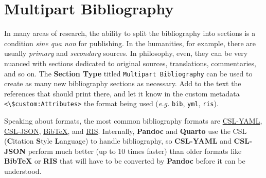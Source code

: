 \documentclass[
  12pt,
  a4paper,
  oneside,
  titlepage,
  toclink=all,
  toc=bibliography]{scrbook}
\theoremstyle{definition}
\theoremstyle{plain}
\theoremstyle{plain}
\theoremstyle{plain}
\theoremstyle{plain}
\theoremstyle{definition}
\theoremstyle{definition}
\theoremstyle{plain}
\theoremstyle{remark}
\begin{document}
\hypertarget{sec-scriv49}{%
\section{Multipart Bibliography}\label{sec-scriv49}}

\protect\hypertarget{scriv49}{}{}

In many areas of research, the ability to split the bibliography into
sections is a condition \emph{sine qua non} for publishing. In the
humanities, for example, there are usually \emph{primary} and
\emph{secondary} sources. In philosophy, even, they can be very nuanced
with sections dedicated to original sources, translations, commentaries,
and so on. The \textbf{Section Type} titled
\texttt{Multipart\ Bibliography} can be used to create as many new
bibliography sections as necessary. Add to the text the references that
should print there, and let it know in the custom metadata
\texttt{\textless{}\textbackslash{}\$custom:Attributes\textgreater{}}
the format being used (\emph{e.g.} \texttt{bib}, \texttt{yml},
\texttt{ris}).

\begin{tcolorbox}[enhanced jigsaw, left=2mm, colframe=quarto-callout-tip-color-frame, bottomtitle=1mm, colback=white, coltitle=black, title=\textcolor{quarto-callout-tip-color}{\faLightbulb}\hspace{0.5em}{Bibliography formats}, toprule=.15mm, rightrule=.15mm, opacityback=0, breakable, toptitle=1mm, titlerule=0mm, colbacktitle=quarto-callout-tip-color!10!white, arc=.35mm, bottomrule=.15mm, leftrule=.75mm, opacitybacktitle=0.6]

Speaking about formats, the most common bibliography formats are
\href{https://docs.citationstyles.org/en/stable/specification.html}{CSL-YAML},
\href{https://docs.citationstyles.org/en/stable/specification.html}{CSL-JSON},
\href{https://en.wikipedia.org/wiki/BibTeX\#Entry_types}{BibTeX}, and
\href{https://en.wikipedia.org/wiki/RIS_(file_format)\#Type_of_reference}{RIS}.
Internally, \textbf{Pandoc} and \textbf{Quarto} use the CSL
(\textbf{C}itation \textbf{S}tyle \textbf{L}anguage) to handle
bibliography, so \textbf{CSL-YAML} and \textbf{CSL-JSON} perform much
better (up to 10 times faster) than older formats like \textbf{BibTeX}
or \textbf{RIS} that will have to be converted by \textbf{Pandoc} before
it can be understood.

\end{tcolorbox}
\end{document}
